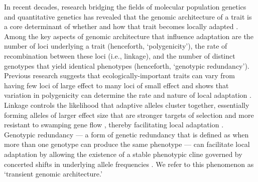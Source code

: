 \documentclass[9pt,twocolumn,twoside,lineno]{new_article}
\begin{document}
In recent decades, research bridging the fields
of molecular population genetics
and quantitative genetics
\cite{barghi_polygenic,barton,pritchard_human_adaptation,pritchard_sweeps_alone}
has revealed that the genomic architecture of a trait
is a core determinant of whether and how that trait
becomes locally adapted \cite{yeaman_review}.
Among the key aspects of genomic architecture that influence adaptation
\cite{barton,yeaman_whitlock,yeaman_review,lecorre} are
the number of loci underlying a trait (henceforth, `polygenicity'),
the rate of recombination between these loci (i.e., linkage),
and the number of distinct genotypes that yield identical phenotypes
(henceforth, `genotypic redundancy'). Previous research suggests that ecologically-important traits can vary from having
few loci of large effect \cite{martin,rees}
to many loci of small effect \cite{boyle,rockman,savolainen,sella,barghi_polygenic}
and shows that variation in polygenicity can
determine the rate and nature of local adaptation \cite{yeaman_amnat}. 
Linkage controls the likelihood that adaptive alleles cluster together,
essentially forming alleles of larger effect size that are stronger 
targets of selection and more resistant
to swamping gene flow \cite{yeaman_whitlock},
thereby facilitating local adaptation \cite{tigano}.
Genotypic redundancy --- a form of genetic redundancy that is defined as when more than one genotype can produce the same phenotype \cite{laruson} --- can facilitate local adaptation 
by allowing the existence of a stable phenotypic cline
governed by concerted shifts in underlying allele frequencies
\cite{barghi_redundancy,manceau,yeaman_amnat}.
We refer to this phenomenon as `transient genomic architecture.'
\end{document}
